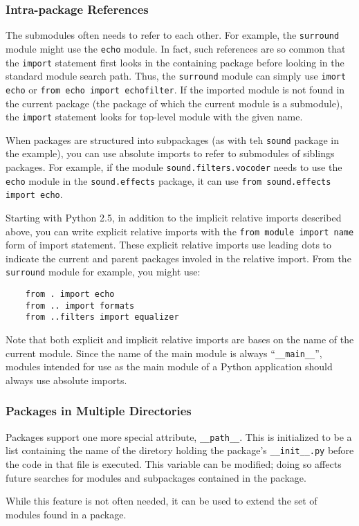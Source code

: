 \documentclass[UTF8]{article}
\begin{document}
\subsubsection{Intra-package References}
The submodules often needs to refer to each other. For example, the \texttt{surround} module might
use the \texttt{echo} module. In fact, such references are so common that the \texttt{import}
statement first looks in the containing package before looking in the standard module search path.
Thus, the \texttt{surround} module can simply use \texttt{imort echo} or
\texttt{from echo import echofilter}. If the imported module is not found in the current
package (the package of which the current module is a submodule), the \texttt{import} statement
looks for top-level module with the given name.

When packages are structured into subpackages (as with teh \texttt{sound} package in the example),
you can use absolute imports to refer to submodules of siblings packages. For example, if the
module \texttt{sound.filters.vocoder} needs to use the \texttt{echo} module in the
\texttt{sound.effects} package, it can use \texttt{from sound.effects import echo}.

Starting with Python 2.5, in addition to the implicit relative imports described above, you can
write explicit relative imports with the \texttt{from module import name} form of
import statement. These explicit relative imports use leading dots to indicate the current and
parent packages involed in the relative import. From the \texttt{surround} module for example, you
might use:
\begin{verbatim}
    from . import echo
    from .. import formats
    from ..filters import equalizer
\end{verbatim}

Note that both explicit and implicit relative imports are bases on the name of the current module.
Since the name of the main module is always ``\texttt{\_\_main\_\_}'', modules intended for use as
the main module of a Python application should always use absolute imports.

\subsubsection{Packages in Multiple Directories}
Packages support one more special attribute, \texttt{\_\_path\_\_}. This is initialized to be a
list containing the name of the diretory holding the package's \texttt{\_\_init\_\_.py} before the
code in that file is executed. This variable can be modified; doing so affects future searches for
modules and subpackages contained in the package.

While this feature is not often needed, it can be used to extend the set of modules found in a
package.
\end{document}
